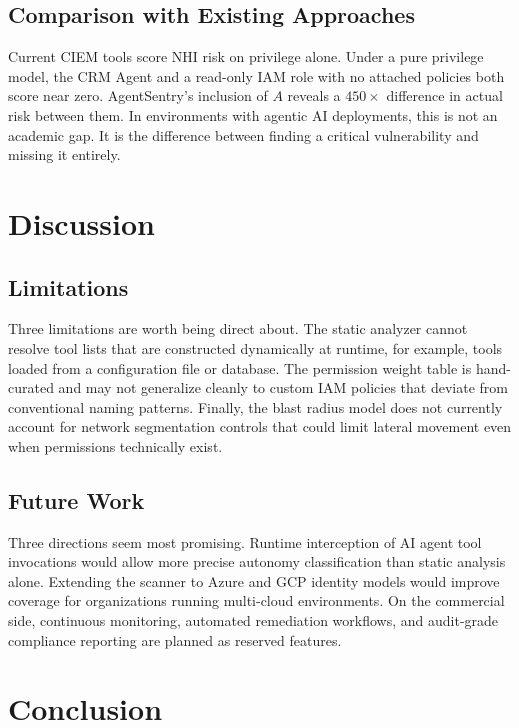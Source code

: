 \documentclass[conference]{IEEEtran}
\begin{document}
\subsection{Comparison with Existing Approaches}

Current CIEM tools score NHI risk on privilege alone. Under a pure privilege
model, the CRM Agent and a read-only IAM role with no attached policies both
score near zero. AgentSentry's inclusion of $A$ reveals a $450\times$
difference in actual risk between them. In environments with agentic AI
deployments, this is not an academic gap. It is the difference between finding
a critical vulnerability and missing it entirely.

\section{Discussion}

\subsection{Limitations}

Three limitations are worth being direct about. The static analyzer cannot
resolve tool lists that are constructed dynamically at runtime, for example,
tools loaded from a configuration file or database. The permission weight table
is hand-curated and may not generalize cleanly to custom IAM policies that
deviate from conventional naming patterns. Finally, the blast radius model does
not currently account for network segmentation controls that could limit lateral
movement even when permissions technically exist.

\subsection{Future Work}

Three directions seem most promising. Runtime interception of AI agent tool
invocations would allow more precise autonomy classification than static
analysis alone. Extending the scanner to Azure and GCP identity models would
improve coverage for organizations running multi-cloud environments. On the
commercial side, continuous monitoring, automated remediation workflows, and
audit-grade compliance reporting are planned as reserved features.

\section{Conclusion}
\end{document}
